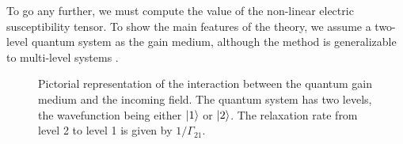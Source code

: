 To go any further, we must compute the value of the non-linear electric
susceptibility tensor. 
To show the main features of the theory, we assume a two-level quantum 
system as the gain medium, although the method is generalizable to 
multi-level systems \cite[\S2.3]{GE2010b}. 

\begin{figure}
 \begin{center}
 \end{center}
 \caption[Pictorial representation of the quantum gain medium]
	 {Pictorial representation of the interaction between the
	 quantum gain medium and the incoming field. The quantum system has 
	 two levels, the wavefunction being either $\Ket{1}$ or $\Ket{2}$. The relaxation
	 rate from level 2 to level 1 is given by $1/\Gamma_{21}$.}
 \label{fig:active.salt.twoLevelSystem}
\end{figure}

